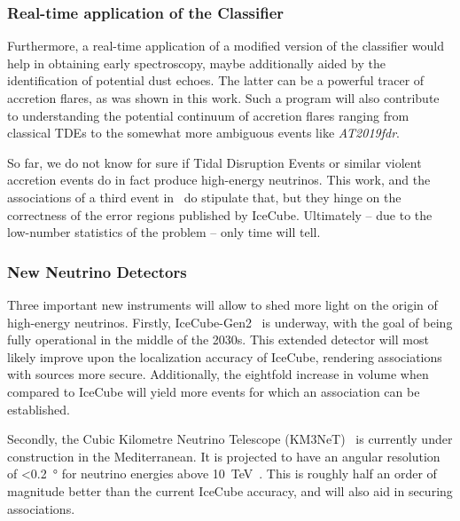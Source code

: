 \subsubsection{Real-time application of the Classifier}
Furthermore, a real-time application of a modified version of the classifier would help in obtaining early spectroscopy, maybe additionally aided by the identification of potential dust echoes. The latter can be a powerful tracer of accretion flares, as was shown in this work. Such a program will also contribute to understanding the potential continuum of accretion flares ranging from classical TDEs to the somewhat more ambiguous events like \textit{AT2019fdr}.

So far, we do not know for sure if Tidal Disruption Events or similar violent accretion events do in fact produce high-energy neutrinos. This work, and the associations of a third event in~\cite{Velzen2021} do stipulate that, but they hinge on the correctness of the error regions published by IceCube. Ultimately -- due to the low-number statistics of the problem -- only time will tell.

\subsubsection{New Neutrino Detectors}
Three important new instruments will allow to shed more light on the origin of high-energy neutrinos. Firstly, IceCube-Gen2~ is underway, with the goal of being fully operational in the middle of the 2030s. This extended detector will most likely improve upon the localization accuracy of IceCube, rendering associations with sources more secure. Additionally, the eightfold increase in volume when compared to IceCube will yield more events for which an association can be established.

Secondly, the Cubic Kilometre Neutrino Telescope (KM3NeT)~ is currently under construction in the Mediterranean. It is projected to have an angular resolution of \SI{<0.2}{\degree} for neutrino energies above \SI{10}{\tera\eV}~. This is roughly half an order of magnitude better than the current IceCube accuracy, and will also aid in securing associations.

